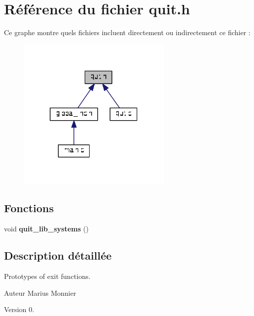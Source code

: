 \section{Référence du fichier quit.\+h}
\label{quit_8h}
Ce graphe montre quels fichiers incluent directement ou indirectement ce fichier \+:
\nopagebreak
\begin{figure}[H]
\begin{center}
\leavevmode
\includegraphics[width=212pt]{quit_8h__dep__incl}
\end{center}
\end{figure}
\subsection*{Fonctions}
\begin{DoxyCompactItemize}
\item 
\mbox{\label{quit_8h_a041c01db677559185eea53ef91f60d1a}} 
void {\bfseries quit\+\_\+lib\+\_\+systems} ()
\end{DoxyCompactItemize}


\subsection{Description détaillée}
Prototypes of exit functions. 

\begin{DoxyAuthor}{Auteur}
Marius Monnier 
\end{DoxyAuthor}
\begin{DoxyVersion}{Version}
0. 
\end{DoxyVersion}
